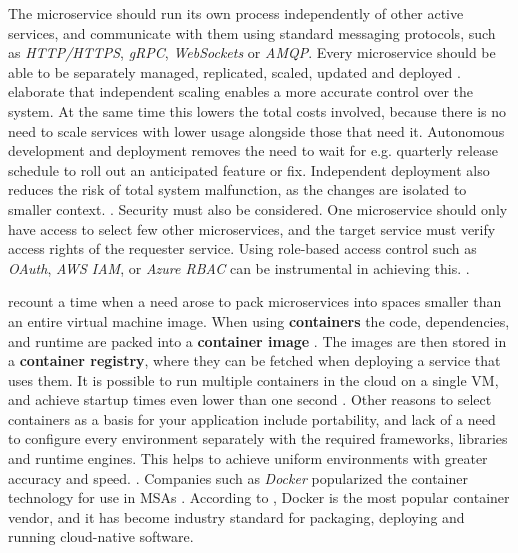 \documentclass[utf8,english]{gradu3}
\begin{document}
The microservice should run its own process independently of other active
services, and communicate with them using standard messaging protocols, such as
\textit{HTTP/HTTPS}, \textit{gRPC}, \textit{WebSockets} or \textit{AMQP}. Every
microservice should be able to be separately managed, replicated, scaled,
updated and deployed \parencite[18]{Gannon2017}. \textcite{Microsoft2022-CNA}
elaborate that independent scaling enables a more accurate control over the
system. At the same time this lowers the total costs involved, because there is
no need to scale services with lower usage alongside those that need it.
Autonomous development and deployment removes the need to wait for e.g.
quarterly release schedule to roll out an anticipated feature or fix.
Independent deployment also reduces the risk of total system malfunction, as the
changes are isolated to smaller context. \parencite{Microsoft2022-CNA}. Security
must also be considered. One microservice should only have access to select few
other microservices, and the target service must verify access rights of the
requester service. Using role-based access control such as \textit{OAuth},
\textit{AWS IAM}, or \textit{Azure RBAC} can be instrumental in achieving this.
\parencite[18]{Gannon2017}.

\textcite[18]{Gannon2017} recount a time when a need arose to pack microservices
into spaces smaller than an entire virtual machine image. When using
\textbf{containers} the code, dependencies, and runtime are packed into a
\textbf{container image} \parencite{Microsoft2022-CNA}. The images are then stored
in a \textbf{container registry}, where they can be fetched when deploying a
service that uses them. It is possible to run multiple containers in the cloud
on a single VM, and achieve startup times even lower than one second
\parencite[18]{Gannon2017}. Other reasons to select containers as a basis for
your application include portability, and lack of a need to configure every
environment separately with the required frameworks, libraries and runtime
engines. This helps to achieve uniform environments with greater accuracy and
speed. \parencite{Microsoft2022-CNA}. Companies such as \textit{Docker} popularized
the container technology for use in MSAs \parencite[18]{Gannon2017}. According
to \textcite{Microsoft2022-CNA}, Docker is the most popular container vendor, and it
has become industry standard for packaging, deploying and running cloud-native
software.
\end{document}
